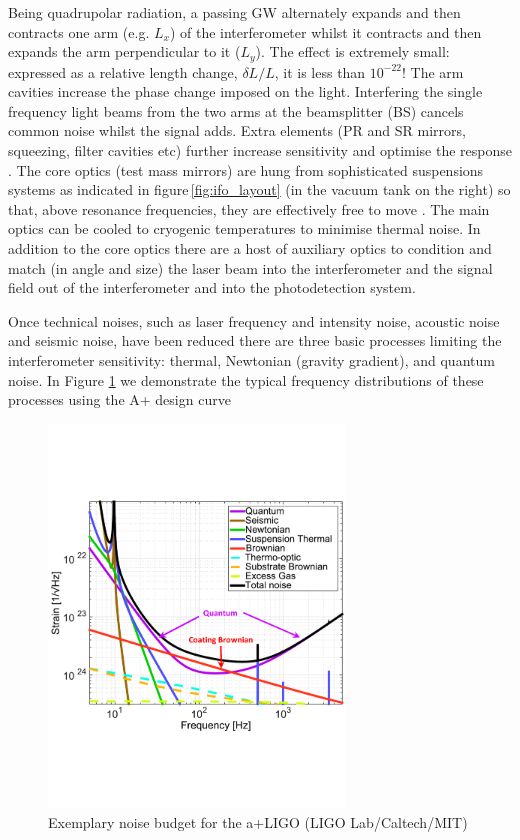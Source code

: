 Being quadrupolar radiation, a passing \ac{GW}  alternately expands and then contracts one arm (e.g. $L_x$) of the interferometer whilst it contracts and then expands the arm perpendicular to it ($L_y$).  The effect is extremely small: expressed as a relative length change, $\delta L/L$, it is less than $10^{-22}$! The arm cavities increase the phase change imposed on the light. Interfering the single frequency light beams from the two arms at the beamsplitter (BS) cancels common noise whilst the signal adds. Extra elements (\ac{PR} and \ac{SR} mirrors, squeezing, filter cavities etc)  further increase sensitivity and optimise the response \cite{InterferometerTechniquesBond2017}.  
The core optics (test mass mirrors) are hung from sophisticated suspensions systems as indicated in figure\,\ref{fig:ifo_layout} (in the vacuum tank on the right) so that, above resonance frequencies, they are effectively free to move \cite{SuspensionsvVeggel2018}. The main optics can be cooled to cryogenic temperatures to minimise thermal noise. In addition to the  core optics there are a host of auxiliary optics to condition  and match (in angle and size) the laser beam into the interferometer  and the signal field out of the interferometer and into the photodetection system. 

Once technical noises, such as laser frequency and intensity noise, acoustic noise and seismic noise, have been reduced there are three basic processes limiting the interferometer sensitivity: thermal, Newtonian (gravity gradient), and quantum noise. 
In Figure \ref{A+noisebudget} we demonstrate the typical frequency distributions of these processes using the A+ design curve \cite{}

\begin{figure}
\centering
\includegraphics[width=0.7\textwidth]{Figures/APlusBudget.pdf}
\caption{Exemplary noise budget for the \acf{a+LIGO} (LIGO Lab/Caltech/MIT)}
\label{A+noisebudget}
\end{figure}

